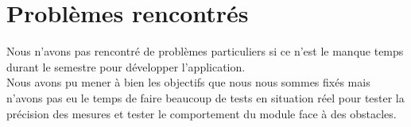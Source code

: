 \section{Problèmes rencontrés}
Nous n'avons pas rencontré de problèmes particuliers si ce n'est le manque temps durant le semestre pour développer l'application.\\
Nous avons pu mener à bien les objectifs que nous nous sommes fixés mais n'avons pas eu le temps de faire beaucoup de tests en situation réel pour tester la précision des mesures et tester le comportement du module face à des obstacles.